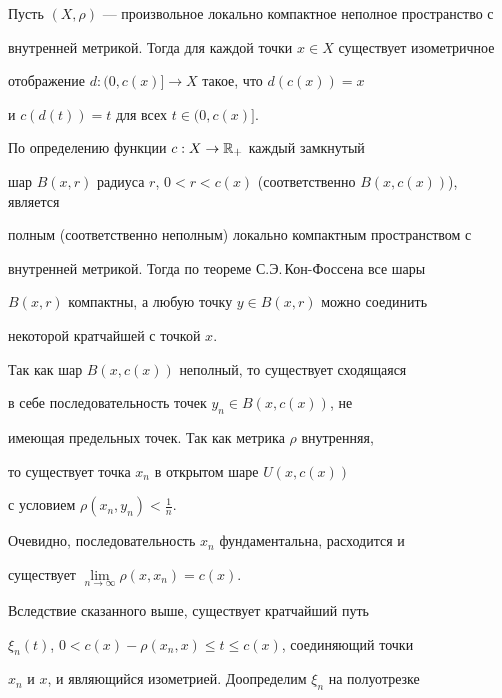 \begin{lems}


\label{lem}


Пусть $(X,\rho)$ --- произвольное локально компактное неполное пространство с


внутренней метрикой. Тогда для каждой точки $x \in X$ существует изометричное


отображение $d: (0,c(x)] \rightarrow X$ такое, что $d(c(x))=x$


и $c(d(t))=t$ для всех $t \in (0,c(x)]$.


\end{lems}





\begin{pf}


По определению функции $c: X \rightarrow \Bbb{R}_{+}$ каждый замкнутый


шар $B(x,r)$ радиуса $r$, $0<r< c(x)$ (соответственно $B(x,c(x))$), является


полным (соответственно неполным) локально компактным пространством с


внутренней метрикой. Тогда по теореме С.Э.\,Кон-Фоссена \cite{CV} все шары


$B(x,r)$ компактны, а любую точку $y \in B(x,r)$ можно соединить


некоторой кратчайшей с точкой $x$.





Так как шар $B(x,c(x))$ неполный, то существует сходящаяся


в себе последовательность точек $y_{n} \in B(x,c(x))$, не


имеющая предельных точек. Так как метрика $\rho$ внутренняя,


то существует точка $x_{n}$ в открытом шаре $U(x,c(x))$


с условием $\rho(x_{n},y_{n})<\frac{1}{n}$.


Очевидно, последовательность $x_{n}$ фундаментальна, расходится и


существует $\lim\limits_{n\rightarrow\infty} \rho(x,x_{n})= c(x)$.


Вследствие сказанного выше, существует кратчайший путь


$\xi_{n}(t)$, $0< c(x)-\rho(x_{n},x)\leq t \leq c(x)$, соединяющий точки


$x_{n}$ и $x$, и являющийся изометрией. Доопределим $\xi_{n}$ на полуотрезке



\end{pf}
